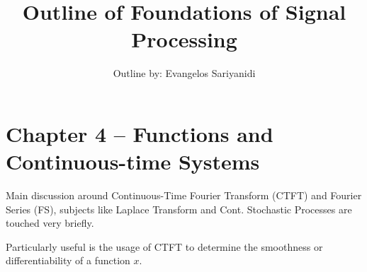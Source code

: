 \documentclass{article}
\begin{document}
\author{Outline by: Evangelos Sariyanidi}

\title{\bf Outline of Foundations of Signal Processing}
\maketitle
\section*{Chapter 4 -- Functions and Continuous-time Systems}
Main discussion around Continuous-Time Fourier Transform (CTFT) and Fourier Series (FS), subjects like Laplace Transform and Cont. Stochastic Processes are touched very briefly.

Particularly useful is the usage of CTFT to determine the smoothness or differentiability of a function $x$.
\end{document}
